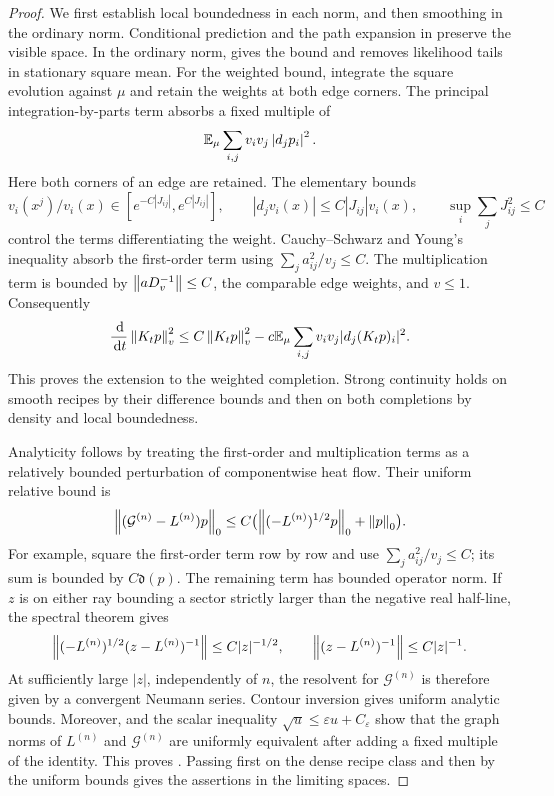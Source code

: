 \begin{proof}
We first establish local boundedness in each norm, and then smoothing in
the ordinary norm.  Conditional prediction and the path expansion in
 preserve the visible space.  In the ordinary norm,
 gives the bound and removes likelihood tails in
stationary square mean.  For the weighted bound, integrate the square
evolution against $\mu$ and retain the weights at both edge corners.
The principal integration-by-parts term absorbs a fixed multiple of
\[
 \mathbb E_\mu\sum_{i,j}v_iv_j\left\lvert d_jp_i\right\rvert^2.
\]
Here both corners of an edge are retained.  The elementary bounds
\[
 v_i(x^j)/v_i(x)\in[e^{-C|J_{ij}|},e^{C|J_{ij}|}],
 \qquad |d_jv_i(x)|\le C|J_{ij}|v_i(x),
 \qquad \sup_i\sum_jJ_{ij}^2\le C
\]
control the terms differentiating the weight.  Cauchy--Schwarz and Young's
inequality absorb the first-order term using
$\sum_j a_{ij}^2/v_j\le C$.  The multiplication term is bounded by
$\left\lVert aD_v^{-1}\right\rVert\le C$, the comparable edge weights, and $v\le1$.
Consequently
\[
 \frac{\,\mathrm d}{\,\mathrm d t}\left\lVert K_tp\right\rVert_v^2
 \le C\left\lVert K_tp\right\rVert_v^2
   -c\mathbb E_\mu\sum_{i,j}v_iv_j|d_j(K_tp)_i|^2.
\]
This proves the extension to the weighted completion.  Strong continuity
holds on smooth recipes by their difference bounds and then on both
completions by density and local boundedness.

Analyticity follows by treating the first-order and multiplication terms
as a relatively bounded perturbation of componentwise heat flow.  Their
uniform relative bound is
\begin{equation}\label{eq:exact-relative}
 \left\lVert (\mathcal G^{(n)}-L^{(n)})p\right\rVert_0
 \le C\bigl(\left\lVert (-L^{(n)})^{1/2}p\right\rVert_0+\left\lVert p\right\rVert_0\bigr).
\end{equation}
For example, square the first-order term row by row and use
$\sum_j a_{ij}^2/v_j\le C$; its sum is bounded by $C\mathfrak d(p)$.
The remaining term has bounded operator norm.  If $z$ is on either ray
bounding a sector strictly larger than the negative real half-line, the
spectral theorem gives
\[
 \left\lVert (-L^{(n)})^{1/2}(z-L^{(n)})^{-1}\right\rVert
 \le C|z|^{-1/2},\qquad
 \left\lVert (z-L^{(n)})^{-1}\right\rVert\le C|z|^{-1}.
\]
At sufficiently large $|z|$, independently of $n$, the resolvent for
$\mathcal G^{(n)}$ is therefore given by a convergent Neumann series.
Contour inversion gives uniform analytic bounds.  Moreover,
 and the scalar inequality
$\sqrt u\le\varepsilon u+C_\varepsilon$ show that the graph norms of
$L^{(n)}$ and $\mathcal G^{(n)}$ are uniformly equivalent after adding
a fixed multiple of the identity.  This proves .
Passing first on the dense recipe class and then by the uniform bounds
gives the assertions in the limiting spaces.
\end{proof}


